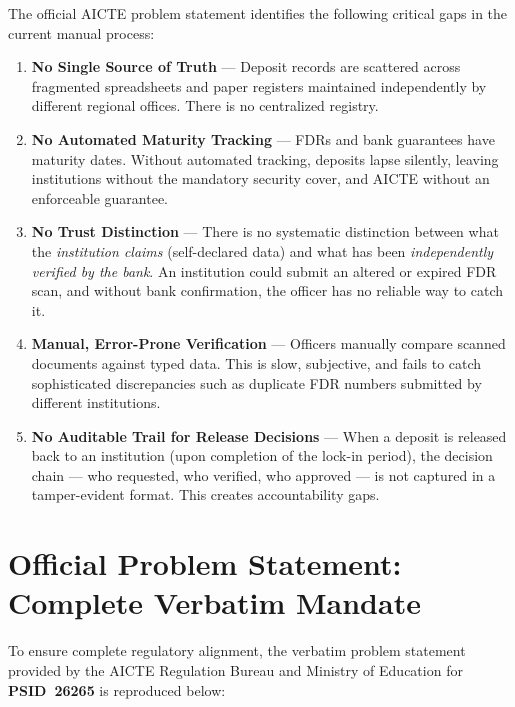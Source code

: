\documentclass[12pt, a4paper]{report}
\newcommand{\psid}{\textbf{PSID~26265}}
\begin{document}
The official AICTE problem statement identifies the following critical gaps in the current manual process:

\begin{problembox}
\begin{enumerate}[label=\textbf{Gap \arabic*:}, leftmargin=3em]
  \item \textbf{No Single Source of Truth} --- Deposit records are scattered across fragmented spreadsheets and paper registers maintained independently by different regional offices. There is no centralized registry.
  
  \item \textbf{No Automated Maturity Tracking} --- FDRs and bank guarantees have maturity dates. Without automated tracking, deposits lapse silently, leaving institutions without the mandatory security cover, and AICTE without an enforceable guarantee.
  
  \item \textbf{No Trust Distinction} --- There is no systematic distinction between what the \emph{institution claims} (self-declared data) and what has been \emph{independently verified by the bank}. An institution could submit an altered or expired FDR scan, and without bank confirmation, the officer has no reliable way to catch it.
  
  \item \textbf{Manual, Error-Prone Verification} --- Officers manually compare scanned documents against typed data. This is slow, subjective, and fails to catch sophisticated discrepancies such as duplicate FDR numbers submitted by different institutions.
  
  \item \textbf{No Auditable Trail for Release Decisions} --- When a deposit is released back to an institution (upon completion of the lock-in period), the decision chain --- who requested, who verified, who approved --- is not captured in a tamper-evident format. This creates accountability gaps.
\end{enumerate}
\end{problembox}


\section{Official Problem Statement: Complete Verbatim Mandate}

To ensure complete regulatory alignment, the verbatim problem statement provided by the AICTE Regulation Bureau and Ministry of Education for \psid{} is reproduced below:
\end{document}
